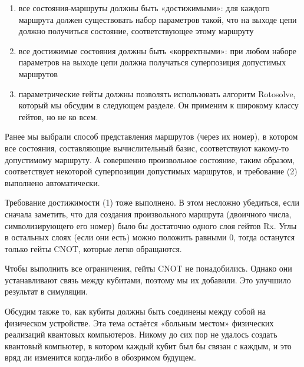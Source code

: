 \begin{enumerate}
    \item все состояния-маршруты должны быть «достижимыми»: для каждого маршрута должен существовать набор параметров такой, что на выходе цепи должно получиться состояние, соответствующее этому маршруту 

    \item все достижимые состояния должны быть «корректными»: при любом наборе параметров на выходе цепи должна получаться суперпозиция допустимых маршрутов
    

    \item параметрические гейты должны позволять использовать алгоритм Rotosolve, который мы обсудим в следующем разделе. Он применим к широкому классу гейтов, но не ко всем.
\end{enumerate}


Ранее мы выбрали способ представления маршрутов (через их номер), в котором все состояния, составляющие вычислительный базис, соответствуют какому-то допустимому маршруту. А совершенно произвольное состояние, таким образом, соответствует некоторой суперпозиции допустимых маршрутов, и требование (2) выполнено автоматически.

Требование достижимости (1) тоже выполнено. В этом несложно убедиться, если сначала заметить, что для создания произвольного маршрута (двоичного числа, символизирующего его номер) было бы достаточно одного слоя гейтов Rx. Углы в остальных слоях (если они есть) можно положить равными 0, тогда останутся только гейты CNOT, которые легко обращаются.


Чтобы выполнить все ограничения, гейты CNOT не понадобились. Однако они устанавливают связь между кубитами, поэтому мы их добавили. Это улучшило результат в симуляции.

Обсудим также то, как кубиты должны быть соединены между собой на физическом устройстве. 
Эта тема остаётся «больным местом» 
физических реализаций квантовых компьютеров. Никому до сих пор не удалось создать квантовый компьютер, в котором каждый кубит был бы связан с каждым, и это вряд ли изменится когда-либо в обозримом будущем.

